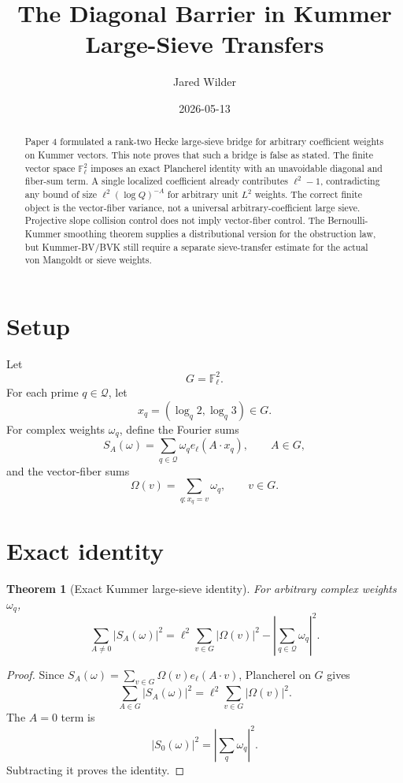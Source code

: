 \documentclass[11pt]{article}
\title{The Diagonal Barrier in Kummer Large-Sieve Transfers}
\author{Jared Wilder}
\date{2026-05-13}
\newtheorem{theorem}{Theorem}
\newcommand{\F}{\mathbb F}
\begin{document}
\maketitle

\begin{abstract}
Paper 4 formulated a rank-two Hecke large-sieve bridge for arbitrary coefficient weights on Kummer vectors.  This note proves that such a bridge is false as stated.  The finite vector space \(\F_\ell^2\) imposes an exact Plancherel identity with an unavoidable diagonal and fiber-sum term.  A single localized coefficient already contributes \(\ell^2-1\), contradicting any bound of size \(\ell^2(\log Q)^{-A}\) for arbitrary unit \(L^2\) weights.  The correct finite object is the vector-fiber variance, not a universal arbitrary-coefficient large sieve.  Projective slope collision control does not imply vector-fiber control.  The Bernoulli-Kummer smoothing theorem supplies a distributional version for the obstruction law, but Kummer-BV/BVK still require a separate sieve-transfer estimate for the actual von Mangoldt or sieve weights.
\end{abstract}

\section{Setup}

Let
\[
G=\F_\ell^2.
\]
For each prime \(q\in\mathcal Q\), let
\[
x_q=(\log_q2,\log_q3)\in G.
\]
For complex weights \(\omega_q\), define the Fourier sums
\[
S_A(\omega)=\sum_{q\in\mathcal Q}\omega_q e_\ell(A\cdot x_q),
\qquad A\in G,
\]
and the vector-fiber sums
\[
\Omega(v)=\sum_{q:x_q=v}\omega_q,
\qquad v\in G.
\]

\section{Exact identity}

\begin{theorem}[Exact Kummer large-sieve identity]\label{T:exact}
For arbitrary complex weights \(\omega_q\),
\[
\sum_{A\ne0}|S_A(\omega)|^2
=
\ell^2\sum_{v\in G}|\Omega(v)|^2
-
\left|\sum_{q\in\mathcal Q}\omega_q\right|^2.
\]
\end{theorem}

\begin{proof}
Since \(S_A(\omega)=\sum_{v\in G}\Omega(v)e_\ell(A\cdot v)\), Plancherel on \(G\) gives
\[
\sum_{A\in G}|S_A(\omega)|^2
=
\ell^2\sum_{v\in G}|\Omega(v)|^2.
\]
The \(A=0\) term is
\[
|S_0(\omega)|^2
=
\left|\sum_q\omega_q\right|^2.
\]
Subtracting it proves the identity.
\end{proof}
\end{document}
